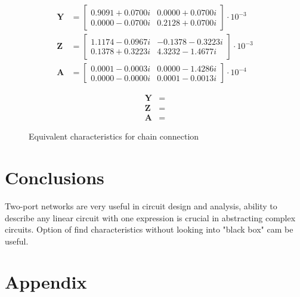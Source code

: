 \documentclass[notitlepage, a4paper, 11pt]{article}
\begin{document}
	\begin{figure}[H]
		\begin{subfigure}{0.45\textwidth}
			\begin{align*}
				\mathbf{Y} &= 
				\begin{bmatrix}
					0.9091 + 0.0700i  & 0.0000 + 0.0700i \\
					0.0000 - 0.0700i  & 0.2128 + 0.0700i
				\end{bmatrix}
				\cdot 10^{-3}
				\\
				\mathbf{Z} &= 
				\begin{bmatrix}
					1.1174 - 0.0967i & -0.1378 - 0.3223i \\
					0.1378 + 0.3223i & 4.3232 - 1.4677i
				\end{bmatrix}
				\cdot 10^{-3}
				\\
				\mathbf{A} &= 
				\begin{bmatrix}
					0.0001 - 0.0003i & 0.0000 - 1.4286i \\
					0.0000 - 0.0000i & 0.0001 - 0.0013i
				\end{bmatrix}
				\cdot 10^{-4}
			\end{align*}
		\end{subfigure}
		\hfill
		\begin{subfigure}{0.45\textwidth}
			\begin{align*}
				\mathbf{Y} &= 
				\\
				\mathbf{Z} &= 
				\\
				\mathbf{A} &= 
			\end{align*}
		\end{subfigure}
		\caption{Equivalent characteristics for chain connection}
	\end{figure}
	
	\section{Conclusions}
	Two-port networks are very useful in circuit design and analysis, ability to describe any linear circuit with one expression is crucial in abstracting complex circuits. Option of find characteristics without looking into "black box" cam be useful.
	
	\newpage
	\appendix
	\section{Appendix}
	\inputminted{matlab}{../Matlab/main.m}
	\inputminted{matlab}{../Matlab/import_csv.m}
	\inputminted{matlab}{../Matlab/Y_to_Z.m}
	\inputminted{matlab}{../Matlab/chain_to_Z.m}
	\inputminted{matlab}{../Matlab/Z_to_admittance.m}
	\inputminted{matlab}{../Matlab/Z_to_chain.m}
	
\end{document}

